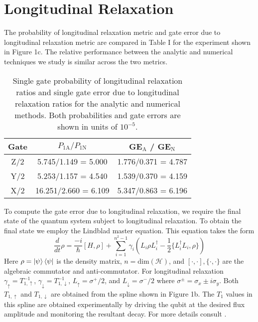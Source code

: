 \section{Longitudinal Relaxation}
The probability of longitudinal relaxation metric and gate error due to longitudinal
relaxation metric are compared in Table I for the experiment shown in Figure 1c.
The relative performance between the analytic and numerical techniques we study
is similar across the two metrics.

\begin{table}[h!]
  \begin{tabular}{c | c | c}
    Gate & $P_{1\textrm{A}} / P_{1\textrm{N}}$ & GE$_{\textrm{A}}$ / GE$_{\textrm{N}}$\\
    \hline
    Z/2 & 5.745/1.149 = 5.000 & 1.776/0.371 = 4.787\\
    Y/2 & 5.253/1.157 = 4.540 & 1.539/0.370 = 4.159\\
    X/2 & 16.251/2.660 = 6.109 & 5.347/0.863 = 6.196\\
  \end{tabular}
  \caption{
    Single gate probability of longitudinal relaxation
    ratios and single gate error due to longitudinal relaxation
    ratios for the analytic and numerical methods. Both probabilities
    and gate errors are shown in units of $10^{-5}$.
  }
\end{table}

To compute the gate error due to longitudinal relaxation,
we require the final state of the quantum system subject
to longitudinal relaxation. To obtain the final state we employ
the Lindblad master equation. This equation takes the form
\begin{equation}
  \frac{d}{dt} \rho = \frac{-i}{\hbar} [H, \rho]
  + \sum_{i = 1}^{n^{2} - 1} \gamma_{i} (L_{i} \rho L_{i}^{\dagger}
  - \frac{1}{2} \{L_{i}^{\dagger} L_{i}, \rho\})
\end{equation}
Here $\rho = \ket{\psi}\bra{\psi}$ is the density matrix, $n = \textrm{dim}(\mathcal{H})$,
and $[\cdot, \cdot], \{\cdot, \cdot \}$ are the algebraic commutator and anti-commutator.
For longitudinal relaxation $\gamma_{\uparrow} = T_{1, \uparrow}^{-1}$,
$\gamma_{\downarrow} = T_{1, \downarrow}^{-1}$,
$L_{\uparrow} = \sigma^{+}/2$, and
$L_{\downarrow} = \sigma^{-}/2$ where $\sigma^{\pm} = \sigma_{x} \pm i \sigma_{y}$.
Both $T_{1, \uparrow}$ and $T_{1, \downarrow}$ are obtained from the spline shown in Figure 1b.
The $T_{1}$ values in this spline are obtained experimentally by driving the qubit at the desired flux amplitude
and monitoring the resultant decay. For more details consult \cite{zhang2020universal}.

